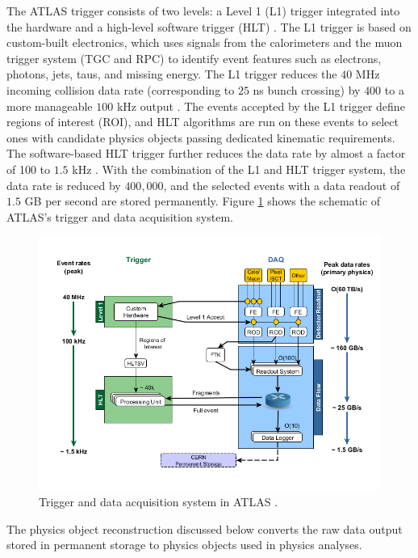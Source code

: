 The ATLAS trigger consists of two levels: a Level 1 (L1) trigger integrated into the hardware and a high-level software trigger (HLT) \cite{TriggerSystemATLAS}. The L1 trigger is based on custom-built electronics, which uses signals from the calorimeters and the muon trigger system (TGC and RPC) to identify event features such as electrons, photons, jets, taus, and missing energy. The L1 trigger reduces the $40$ MHz incoming collision data rate (corresponding to $25$ ns bunch crossing) by $400$ to a more manageable $100$ kHz output \cite{TriggerSystemATLAS}. The events accepted by the L1 trigger define regions of interest (ROI), and HLT algorithms are run on these events to select ones with candidate physics objects passing dedicated kinematic requirements. The software-based HLT trigger further reduces the data rate by almost a factor of 100 to $1.5$ kHz \cite{ATLAS}. With the combination of the L1 and HLT trigger system, the data rate is reduced by $400,000$, and the selected events with a data readout of $1.5$ GB per second are stored permanently. Figure \ref{fig:DAQ} shows the schematic of ATLAS's trigger and data acquisition system. 

\begin{figure}[!htbp]
    \centering
    \includegraphics[width=.8\linewidth]{figures/LHC/DAQ_ATLAS.png}
    \caption{ Trigger and data acquisition system in ATLAS \cite{ATLAS_DAQ}.\label{fig:DAQ}}
\end{figure}

The physics object reconstruction discussed below converts the raw data output stored in permanent storage to physics objects used in physics analyses. 

